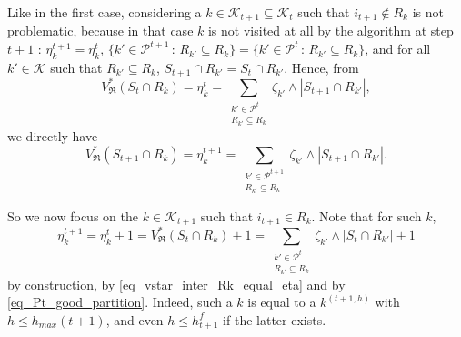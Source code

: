 \documentclass[
  11pt,
  a4paper,
]{article}
\theoremstyle{plain}
\theoremstyle{plain}
\theoremstyle{definition}
\theoremstyle{plain}
\theoremstyle{definition}
\theoremstyle{remark}
\begin{document}
Like in the first case, considering a
\(k\in\mathcal{K}_{t+1}\subseteq \mathcal{K}_t\) such that
\(i_{t+1}\not\in R_k\) is not problematic, because in that case \(k\) is
not visited at all by the algorithm at step \(t+1\) :
\(\eta^{t+1}_k=\eta^{t}_k\),
\(\{k'\in\mathcal{P}^{t+1}\,:\,R_{k'}\subseteq R_k\}=\{k'\in\mathcal{P}^{t}\,:\,R_{k'}\subseteq R_k\}\),
and for all \(k'\in \mathcal{K}\) such that \(R_{k'}\subseteq R_k\),
\(S_{t+1}\cap R_{k'}=S_{t}\cap R_{k'}\). Hence, from \begin{equation*}
V^*_{\mathfrak{R}}(S_{t}\cap R_k) =  \eta_k^{t} =  \sum_{\substack{k'\in\mathcal{P}^{t}\\R_{k'}\subseteq R_k}} \zeta_{k'}\wedge |S_{t+1}\cap R_{k'}| ,
\end{equation*} we directly have \begin{equation*}
V^*_{\mathfrak{R}}(S_{t+1}\cap R_k) =  \eta_k^{t+1} =  \sum_{\substack{k'\in\mathcal{P}^{t+1}\\R_{k'}\subseteq R_k}} \zeta_{k'}\wedge |S_{t+1}\cap R_{k'}| .
\end{equation*}

So we now focus on the \(k\in\mathcal{K}_{t+1}\) such that
\(i_{t+1}\in R_k\). Note that for such \(k\), \begin{equation*}
\eta^{t+1}_k=\eta^t_k+1=V^*_{\mathfrak{R}}(S_t\cap R_k)+1=\sum_{\substack{k'\in \mathcal{P}^t\\ R_{k'}\subseteq R_k}}\zeta_{k'}\wedge|S_t\cap R_{k'}|+1
\end{equation*} by construction, by \eqref{eq_vstar_inter_Rk_equal_eta}
and by \eqref{eq_Pt_good_partition}. Indeed, such a \(k\) is equal to a
\(k^{(t+1,h)}\) with \(h\leq h_{max}(t+1)\), and even
\(h\leq h^f_{t+1}\) if the latter exists.
\end{document}
